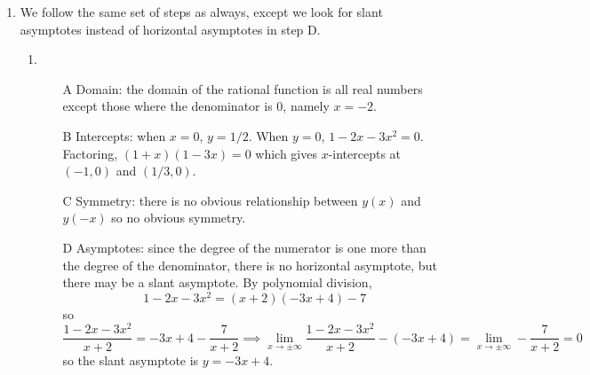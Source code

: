 \documentclass{article}
\begin{document}
\begin{enumerate}
\item %
  We follow the same set of steps as always, except we look for slant
  asymptotes instead of horizontal asymptotes in step D.
  \begin{enumerate}
  \item %
    \begin{itemize}
    \item[A] Domain: the domain of the rational function is all real
      numbers except those where the denominator is $0$, namely
      $x=-2$.
    \item[B] Intercepts: when $x=0$, $y=1/2$.  When $y=0$,
      $1-2x-3x^2=0$.  Factoring, $(1+x)(1-3x)=0$ which gives
      $x$-intercepts at $(-1,0)$ and $(1/3,0)$.
    \item[C] Symmetry: there is no obvious relationship between $y(x)$
      and $y(-x)$ so no obvious symmetry.
    \item[D] Asymptotes: since the degree of the numerator is one more
      than the degree of the denominator, there is no horizontal
      asymptote, but there may be a slant asymptote.  By polynomial
      division,
      \begin{displaymath}
        1-2x-3x^2 = (x+2)(-3x + 4) -7
      \end{displaymath}
      so
      \begin{displaymath}
        \frac{1-2x-3x^2}{x+2} = -3x + 4 - \frac{7}{x+2}
        \implies
        \lim_{x\to\pm\infty} \frac{1-2x-3x^2}{x+2} - (-3x+4)
        = \lim_{x\to\pm\infty} -\frac{7}{x+2} = 0
      \end{displaymath}
      so the slant asymptote is $y=-3x+4$.


\end{itemize}
\end{enumerate}
\end{enumerate}
\end{document}
